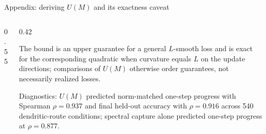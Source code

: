 \begin{frame}{Appendix: deriving $U(M)$ and its exactness caveat}
  \begin{columns}[T,onlytextwidth]
    \begin{column}{0.55\textwidth}
    \end{column}
    \begin{column}{0.42\textwidth}
      {\footnotesize{}\par
       The bound is an upper guarantee for a general $L$-smooth loss and is
       exact for the corresponding quadratic when curvature equals $L$ on the
       update directions; comparisons of $U(M)$ otherwise order guarantees,
       not necessarily realized losses.\par
       \vspace{0.10cm}
       Diagnostics: $U(M)$ predicted norm-matched one-step progress with
       Spearman $\rho=0.937$ and final held-out accuracy with $\rho=0.916$
       across 540 dendritic-route conditions; spectral capture alone
       predicted one-step progress at $\rho=0.877$.\par}
    \end{column}
  \end{columns}
  \vfill
  \vspace{0.04cm}
\end{frame}

